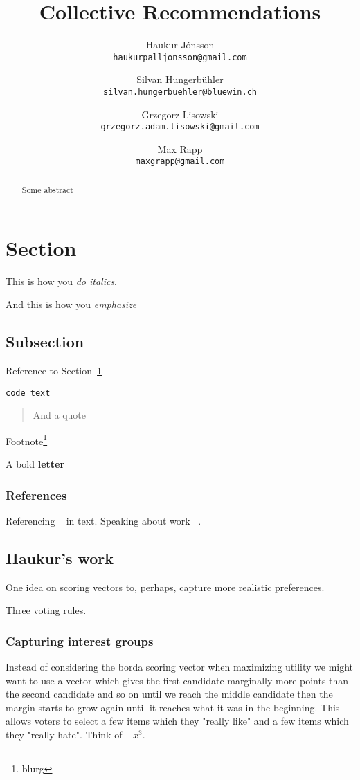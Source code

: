 \documentclass{article}
\title{Collective Recommendations}
\author{
    Haukur J{\'o}nsson \\    \texttt{haukurpalljonsson@gmail.com}
    \and
    Silvan Hungerb{\"u}hler \\   \texttt{silvan.hungerbuehler@bluewin.ch}
    \and
    Grzegorz Lisowski \\  \texttt{grzegorz.adam.lisowski@gmail.com}
    \and
    Max Rapp \\  \texttt{maxgrapp@gmail.com}
}
\begin{document}
\maketitle

\begin{abstract}
Some abstract
\end{abstract}

\section{Section}\label{intro}

This is how you {\it do italics}.

And this is how you {\em emphasize}

\subsection{Subsection}

Reference to Section~\ref{intro}

{\tt code text}

\begin{quote}
And a quote
\end{quote}

Footnote\footnote{blurg}

A bold {\bf letter}

\subsubsection{References}

Referencing ~ in text. Speaking about work ~\cite{Elkind2015}.

\subsection{Haukur's work}

One idea on scoring vectors to, perhaps, capture more realistic preferences.

Three voting rules.

\subsubsection{Capturing interest groups}

Instead of considering the borda scoring vector when maximizing utility we might want to use a vector which gives the
first candidate marginally more points than the second candidate and so on until we reach the middle candidate then the margin
 starts to grow again until it reaches what it was in the beginning. This allows voters to select a few items which they
 "really like" and a few items which they "really hate". Think of $-x^3$.
\end{document}
